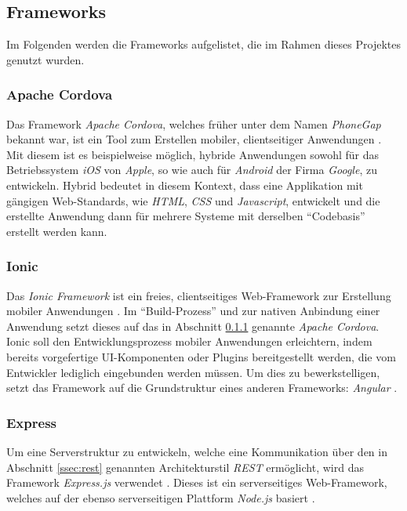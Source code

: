 \documentclass[a4paper, 11pt, DIV=11, listof=numbered, numbers=noenddot]{scrartcl}
\begin{document}
	\newpage
	\subsection{Frameworks}
	Im Folgenden werden die Frameworks aufgelistet, die im Rahmen dieses Projektes genutzt wurden.

	\subsubsection{Apache Cordova}\label{sssec:cordova}
	Das Framework \textit{Apache Cordova}, welches früher unter dem Namen \textit{PhoneGap} bekannt war, ist ein Tool zum Erstellen mobiler, clientseitiger Anwendungen \cite{@Cordova}.
	Mit diesem ist es beispielweise möglich, hybride Anwendungen sowohl für das Betriebssystem \textit{iOS} von \textit{Apple}, so wie auch für \textit{Android} der Firma \textit{Google}, zu entwickeln.
	Hybrid bedeutet in diesem Kontext, dass eine Applikation mit gängigen Web-Standards, wie \textit{HTML}, \textit{CSS} und \textit{Javascript}, entwickelt und die erstellte Anwendung dann für mehrere Systeme mit derselben \enquote{Codebasis} erstellt werden kann.

	\subsubsection{Ionic}\label{sssec:ionic}
	Das \textit{Ionic Framework} ist ein freies, clientseitiges Web-Framework zur Erstellung mobiler Anwendungen \cite{@Ionic}.
	Im \enquote{Build-Prozess} und zur nativen Anbindung einer Anwendung setzt dieses auf das in Abschnitt \ref{sssec:cordova} genannte \textit{Apache Cordova}.\\
	Ionic soll den Entwicklungsprozess mobiler Anwendungen erleichtern, indem bereits vorgefertige UI-Komponenten oder Plugins bereitgestellt werden, die vom Entwickler lediglich eingebunden werden müssen.
	Um dies zu bewerkstelligen, setzt das Framework auf die Grundstruktur eines anderen Frameworks: \textit{Angular} \cite{@Angular}.

	\subsubsection{Express}\label{sssec:express}
	Um eine Serverstruktur zu entwickeln, welche eine Kommunikation über den in Abschnitt \ref{ssec:rest} genannten Architekturstil \textit{REST} ermöglicht, wird das Framework \textit{Express.js} verwendet \cite{@Express}.
	Dieses ist ein serverseitiges Web-Framework, welches auf der ebenso serverseitigen Plattform \textit{Node.js} basiert \cite{@Nodejs}.
	
\end{document}
